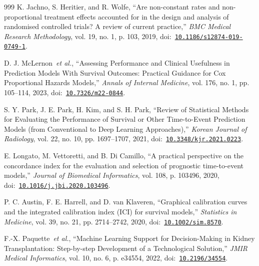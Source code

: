 \begin{thebibliography}{999}
\def\currentbiburl{https://doi.org/10.1186/s12874-019-0749-1}
 K. Jachno, S. Heritier, and R. Wolfe, ``Are non-constant rates and non-proportional treatment effects accounted for in the design and analysis of randomised controlled trials? A review of current practice,'' \emph{BMC Medical Research Methodology}, vol. 19, no. 1, p. 103, 2019, doi:~\href{https://doi.org/10.1186/s12874-019-0749-1}{\nolinkurl{10.1186/s12874-019-0749-1}}.

\def\currentbiburl{https://doi.org/10.7326/m22-0844}
 D. J. McLernon~\emph{et al.}, ``Assessing Performance and Clinical Usefulness in Prediction Models With Survival Outcomes: Practical Guidance for Cox Proportional Hazards Models,'' \emph{Annals of Internal Medicine}, vol. 176, no. 1, pp. 105--114, 2023, doi:~\href{https://doi.org/10.7326/m22-0844}{\nolinkurl{10.7326/m22-0844}}.

\def\currentbiburl{https://doi.org/10.3348/kjr.2021.0223}
 S. Y. Park, J. E. Park, H. Kim, and S. H. Park, ``Review of Statistical Methods for Evaluating the Performance of Survival or Other Time-to-Event Prediction Models (from Conventional to Deep Learning Approaches),'' \emph{Korean Journal of Radiology}, vol. 22, no. 10, pp. 1697--1707, 2021, doi:~\href{https://doi.org/10.3348/kjr.2021.0223}{\nolinkurl{10.3348/kjr.2021.0223}}.

\def\currentbiburl{https://doi.org/10.1016/j.jbi.2020.103496}
 E. Longato, M. Vettoretti, and B. Di Camillo, ``A practical perspective on the concordance index for the evaluation and selection of prognostic time-to-event models,'' \emph{Journal of Biomedical Informatics}, vol. 108, p. 103496, 2020, doi:~\href{https://doi.org/10.1016/j.jbi.2020.103496}{\nolinkurl{10.1016/j.jbi.2020.103496}}.

\def\currentbiburl{https://doi.org/10.1002/sim.8570}
 P. C. Austin, F. E. Harrell, and D. van Klaveren, ``Graphical calibration curves and the integrated calibration index (ICI) for survival models,'' \emph{Statistics in Medicine}, vol. 39, no. 21, pp. 2714--2742, 2020, doi:~\href{https://doi.org/10.1002/sim.8570}{\nolinkurl{10.1002/sim.8570}}.

\def\currentbiburl{https://doi.org/10.2196/34554}
 F.-X. Paquette~\emph{et al.}, ``Machine Learning Support for Decision-Making in Kidney Transplantation: Step-by-step Development of a Technological Solution,'' \emph{JMIR Medical Informatics}, vol. 10, no. 6, p. e34554, 2022, doi:~\href{https://doi.org/10.2196/34554}{\nolinkurl{10.2196/34554}}.


\end{thebibliography}
